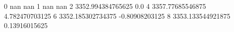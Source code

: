 0 nan nan
1 nan nan
2 3352.994384765625 0.0
4 3357.77685546875 4.782470703125
6 3352.185302734375 -0.80908203125
8 3353.133544921875 0.13916015625
